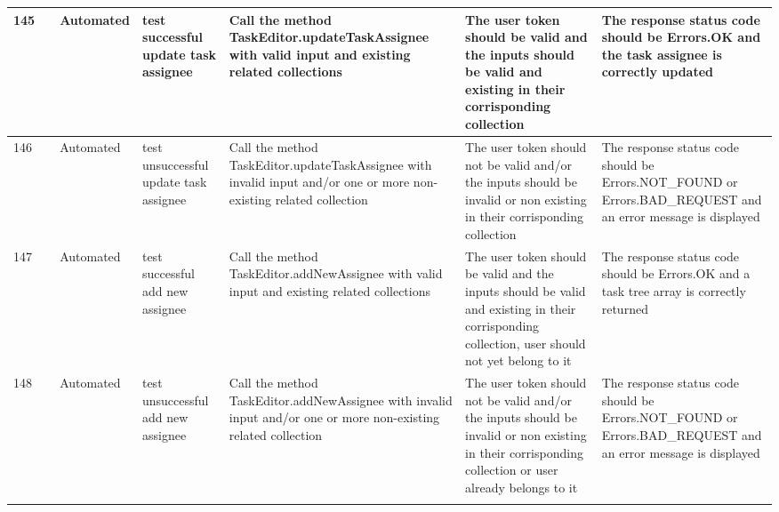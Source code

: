\documentclass{article}
\begin{document}
{\begin{tabular}{|
    >{\columncolor[HTML]{FFFFFF}}l |
    >{\columncolor[HTML]{FFFFFF}}c |
    >{\columncolor[HTML]{FFFFFF}}l |l|l|l|l|}
    145                                 & \cellcolor[HTML]{FFFFFF}                                    & {\color[HTML]{11734B} Automated} & test successful update task assignee                & Call the method TaskEditor.updateTaskAssignee with valid input and existing related collections                            & The user token should be valid and the inputs should be valid and existing in their corrisponding collection                                             & The response status code should be Errors.OK and the task assignee is correctly updated                       \\ \cline{1-1} \cline{3-7} 
    146                                 & \cellcolor[HTML]{FFFFFF}                                    & {\color[HTML]{11734B} Automated} & test unsuccessful update task assignee              & Call the method TaskEditor.updateTaskAssignee with invalid input and/or one or more non-existing related collection        & The user token should not be valid and/or the inputs should be invalid or non existing in their corrisponding collection                                 & The response status code should be Errors.NOT\_FOUND or Errors.BAD\_REQUEST and an error message is displayed \\ \cline{1-1} \cline{3-7} 
    147                                 & \cellcolor[HTML]{FFFFFF}                                    & {\color[HTML]{11734B} Automated} & test successful add new assignee                    & Call the method TaskEditor.addNewAssignee with valid input and existing related collections                                & The user token should be valid and the inputs should be valid and existing in their corrisponding collection, user should not yet belong to it           & The response status code should be Errors.OK and a task tree array is correctly returned                      \\ \cline{1-1} \cline{3-7} 
    148                                 & \cellcolor[HTML]{FFFFFF}                                    & {\color[HTML]{11734B} Automated} & test unsuccessful add new assignee                  & Call the method TaskEditor.addNewAssignee with invalid input and/or one or more non-existing related collection            & The user token should not be valid and/or the inputs should be invalid or non existing in their corrisponding collection or user already belongs to it   & The response status code should be Errors.NOT\_FOUND or Errors.BAD\_REQUEST and an error message is displayed \\ \cline{1-1} \cline{3-7} 

\end{tabular}}
\end{document}
